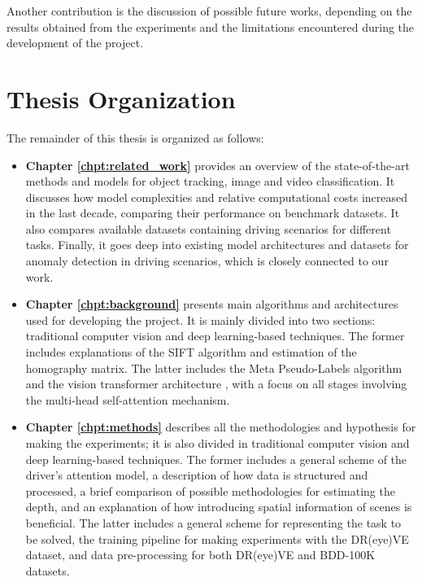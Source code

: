 Another contribution is the discussion of possible future works, 
depending on the results obtained from the experiments and the limitations 
encountered during the development of the project.


\section{Thesis Organization}
\label{sec:organization}
The remainder of this thesis is organized as follows: 
\begin{itemize}
    \item \textbf{Chapter \ref{chpt:related_work}} provides an overview of the 
    state-of-the-art methods and models for object tracking, image and video 
    classification. It discusses how model complexities and relative computational 
    costs increased in the last decade, comparing their performance on benchmark 
    datasets. It also compares available datasets containing driving scenarios 
    for different tasks. Finally, it goes deep into existing model architectures 
    and datasets for anomaly detection in driving scenarios, which is closely 
    connected to our work.
    \item \textbf{Chapter \ref{chpt:background}} presents main algorithms and 
    architectures used for developing the project. It is mainly divided into 
    two sections: traditional computer vision and deep learning-based techniques.
    The former includes explanations of the SIFT algorithm \cite{lowe_sift} and 
    estimation of the homography matrix. The latter includes the Meta Pseudo-Labels 
    algorithm \cite{pham2021meta} and the vision transformer architecture \cite{vit},
    with a focus on all stages involving the multi-head self-attention mechanism.
    \item \textbf{Chapter \ref{chpt:methods}} describes all the methodologies 
    and hypothesis for making the experiments; it is also divided in traditional 
    computer vision and deep learning-based techniques.
    The former includes a general scheme of the driver's attention model, 
    a description of how data is structured and processed, a brief comparison of 
    possible methodologies for estimating the depth, and an explanation of how 
    introducing spatial information of scenes is beneficial.
    The latter includes a general scheme for representing the task to be solved, 
    the training pipeline for making experiments with the DR(eye)VE dataset, and 
    data pre-processing for both DR(eye)VE \cite{dreyeve} and BDD-100K 
    \cite{bdd100k} datasets. 

\end{itemize}
